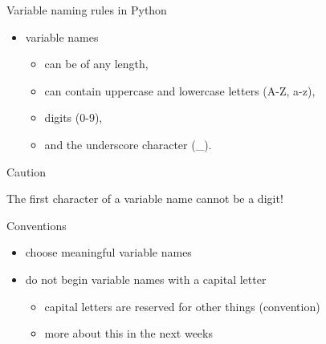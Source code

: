 \documentclass[
  american,
  ignorenonframetext,
]{beamer}
\providecommand{\tightlist}{%
  \setlength{\itemsep}{0pt}\setlength{\parskip}{0pt}}
\begin{document}
\begin{frame}{Variable naming rules in Python}
\protect\hypertarget{variable-naming-rules-in-python}{}

\begin{itemize}
\tightlist
\item
  variable names

  \begin{itemize}
  \tightlist
  \item
    can be of any length,
  \item
    can contain uppercase and lowercase letters (A-Z, a-z),
  \item
    digits (0-9),
  \item
    and the underscore character (\_). \vspace{2em}
  \end{itemize}
\end{itemize}

\begin{block}{Caution}

The first character of a variable name cannot be a digit!


\end{block}

\end{frame}

\begin{frame}{Conventions}
\protect\hypertarget{conventions}{}

\begin{itemize}
\tightlist
\item
  choose meaningful variable names
\item
  do not begin variable names with a capital letter

  \begin{itemize}
  \tightlist
  \item
    capital letters are reserved for other things (convention)
  \item
    more about this in the next weeks
  \end{itemize}
\end{itemize}

\end{frame}
\end{document}
